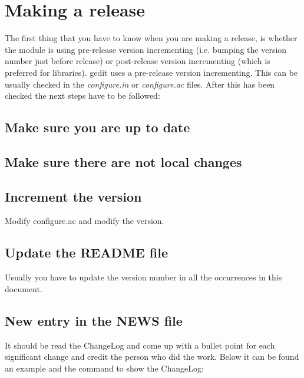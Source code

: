 
\chapter{Making a release}\label{chap:Release}

The first thing that you have to know when you are making a release, is whether the module is using pre-release version incrementing (i.e. bumping the version number just before release) or post-release version incrementing (which is preferred for libraries). gedit uses a pre-release version incrementing. This can be usually checked in the \emph{configure.in} or \emph{configure.ac} files. After this has been checked the next steps have to be followed:

\section*{Make sure you are up to date}

\noindent{}

\section*{Make sure there are not local changes}

\noindent{}

\section*{Increment the version}

\noindent Modify configure.ac and modify the version.

\section*{Update the README file}

\noindent Usually you have to update the version number in all the occurrences in this document.

\section*{New entry in the NEWS file}

\noindent It should be read the ChangeLog and come up with a bullet point for each significant change and credit the person who did the work. Below it can be found an example and the command to show the ChangeLog:

